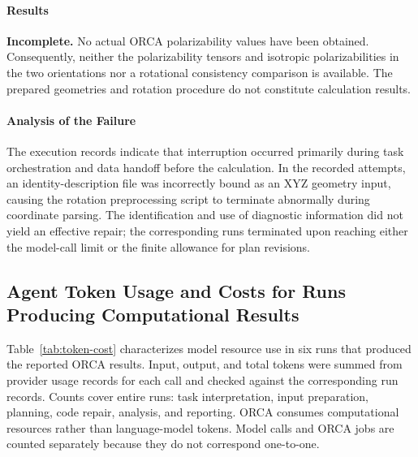 \documentclass[a4paper,11pt]{article}
\begin{document}
\paragraph{Results}
\textbf{Incomplete.} No actual ORCA polarizability values have been obtained.
Consequently, neither the polarizability tensors and isotropic polarizabilities in the two orientations nor a rotational consistency comparison is available.
The prepared geometries and rotation procedure do not constitute calculation results.

\paragraph{Analysis of the Failure}
The execution records indicate that interruption occurred primarily during task orchestration and data handoff before the calculation.
In the recorded attempts, an identity-description file was incorrectly bound as an XYZ geometry input, causing the rotation preprocessing script to terminate abnormally during coordinate parsing.
The identification and use of diagnostic information did not yield an effective repair; the corresponding runs terminated upon reaching either the model-call limit or the finite allowance for plan revisions.

\subsection{Agent Token Usage and Costs for Runs Producing Computational Results}
\label{sec:token-cost}
Table~\ref{tab:token-cost} characterizes model resource use in six runs that produced the reported ORCA results.
Input, output, and total tokens were summed from provider usage records for each call
and checked against the corresponding run records.
Counts cover entire runs: task interpretation, input preparation, planning, code repair, analysis, and reporting.
ORCA consumes computational resources rather than language-model tokens.
Model calls and ORCA jobs are counted separately because they do not correspond one-to-one.
\end{document}
